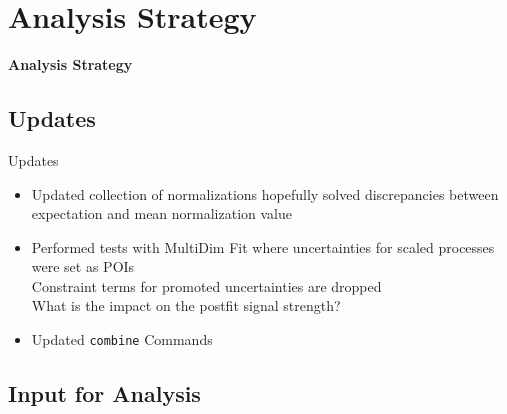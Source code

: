 \section{Analysis Strategy}
\begin{frame}
\centering
\textbf{Analysis Strategy}
\end{frame}
\subsection{Updates}

\begin{frame}{Updates}
\begin{itemize}
\item Updated collection of normalizations \rar hopefully solved discrepancies between expectation and mean normalization value\\
\item Performed tests with MultiDim Fit where uncertainties for scaled processes were set as POIs\\
\rar Constraint terms for promoted uncertainties are dropped\\
\rar What is the impact on the postfit signal strength?
\item Updated \texttt{combine} Commands
\end{itemize}

\end{frame}

\subsection{Input for Analysis}

